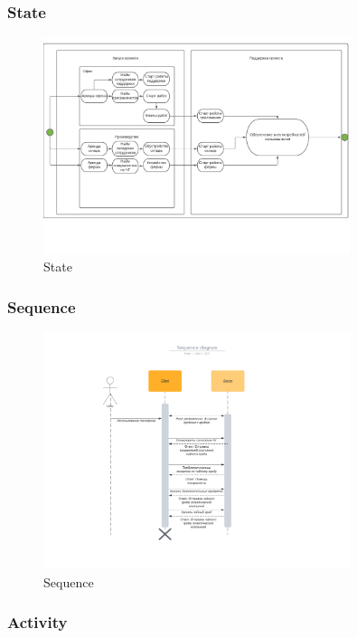 \documentclass[a4paper,8pt]{article}
\begin{document}
\subsubsection{State}

    \begin{figure}[h!]
        \includegraphics[width=0.8\textwidth]{./pics/state.pdf}
        \caption {State}
        \centering
    \end{figure}



\subsubsection{Sequence}

    \begin{figure}[h!]
        \includegraphics[width=0.8\textwidth]{./pics/sequence.pdf}
        \caption {Sequence}
        \centering
    \end{figure}




\subsubsection{Activity}
\end{document}
